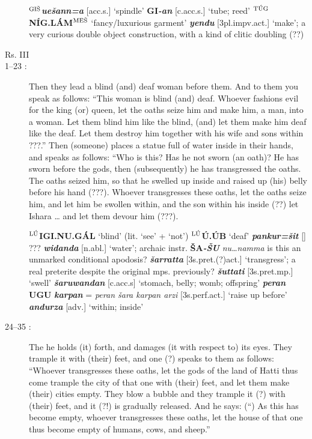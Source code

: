 \documentclass[10pt]{article}
\newcommand{\supersc}[1]{$^{\textrm{\scriptsize{#1}}}$}  	%
\newcommand{\bit}[1]{\textbf{\textit{#1}}}				%
\newcommand{\p}[1]{{\tiny[{#1}]}}					%
\newcommand{\hith}{\textsubwedge{h}}
\newcommand{\Hith}{\textsubwedge{H}}
\newcommand{\man}{\supersc{L\'U}}
\newcommand{\mpl}{\supersc{ME\v{S}}}
\newcommand{\wood}{\supersc{GI\v{S}}}
\renewcommand{\.}[1]{\textsubdot{#1}}
\begin{document}
\begin{description}
\begin{notes}

\textbf{\wood}\bit{{\hith}ue\v{s}ann=a} \p{acc.s.} `spindle' \textbf{GI}\bit{-an} \p{c.acc.s.} `tube; reed' \textbf{\supersc{T\'UG}N\'IG.L\'AM{\mpl}} `fancy/luxurious garment' \bit{yendu} \p{3pl.impv.act.} `make'; a very curious double object construction, with a kind of clitic doubling (??)

\end{notes}

\bigskip
\item[Rs. III]
\bigskip

\item[1--23 :] Then they lead a blind (and) deaf woman before them. And to them you speak as follows: ``This woman is blind (and) deaf. Whoever fashions evil for the king (or) queen, let the oaths seize him and make him, a man, into a woman. Let them blind him like the blind, (and) let them make him deaf like the deaf. Let them destroy him together with his wife and sons within ???.'' Then (someone) places a statue full of water inside in their hands, and speaks as follows: ``Who is this? Has he not sworn (an oath)? He has sworn before the gods, then (subsequently) he has transgressed the oaths. The oaths seized him, so that he swelled up inside and raised up (his) belly before his hand (???). Whoever transgresses these oaths, let the oaths seize him, and let him be swollen within, and the son within his inside (??) let Ishara {\ldots} and let them devour him (???).


\begin{notes}

\textbf{{\man}IGI.NU.G\'AL} `blind' (lit. `see' + `not') \textbf{{\man}\'U.{\Hith}\'UB} `deaf' \bit{pankur=\v{s}it} \p{} ??? \bit{widanda} \p{n.abl.} `water'; archaic instr. \textbf{\v{S}A\textit{-\v{S}U}} \textit{nu{\ldots}namma} is this an unmarked conditional apodosis? \bit{\v{s}arratta} \p{3s.pret.(?)act.} `transgress'; a real preterite despite the original mps. previously? \bit{\v{s}uttati} \p{3s.pret.mp.} `swell' \bit{\v{s}ar{\hith}uwandan} \p{c.acc.s} `stomach, belly; womb; offspring' \bit{peran} \textbf{UGU} \bit{karpan} = \textit{peran \v{s}ara karpan {\hith}arzi} \p{3s.perf.act.} `raise up before' \bit{andurza} \p{adv.} `within; inside'

\end{notes}


\item[24--35 :] The he holds (it) forth, and damages (it with respect to) its eyes. They trample it with (their) feet, and one (?) speaks to them as follows: ``Whoever transgresses these oaths, let the gods of the land of Hatti thus come trample the city of that one with (their) feet, and let them make (their) cities empty. They blow a bubble and they trample it (?) with (their) feet, and it (?!) is gradually released. And he says: (``) As this has become empty, whoever transgresses these oaths, let the house of that one thus become empty of humans, cows, and sheep.'' 



\end{description}
\end{document}
